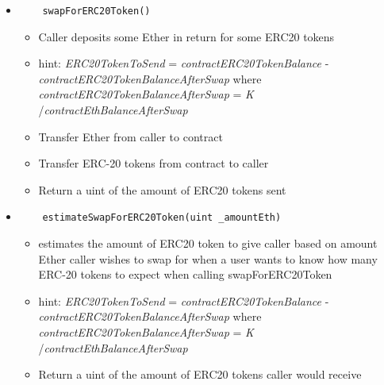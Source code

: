 \documentclass[10pt]{article}
\begin{document}
\begin{itemize}
\item
\begin{verbatim}
    swapForERC20Token() 
\end{verbatim}
\begin{itemize}
    \item Caller deposits some Ether in return for some ERC20 tokens
    \item hint: {\it ERC20TokenToSend} = {\it contractERC20TokenBalance}  - {\it contractERC20TokenBalanceAfterSwap} where {\it contractERC20TokenBalanceAfterSwap} = {\it K} /{\it contractEthBalanceAfterSwap}
    \item Transfer Ether from caller to contract
    \item Transfer ERC-20 tokens from contract to caller
    \item Return a uint of the amount of ERC20 tokens sent
\end{itemize}

\item
\begin{verbatim}
    estimateSwapForERC20Token(uint _amountEth)
\end{verbatim}
\begin{itemize}
    \item estimates the amount of ERC20 token to give caller based on amount Ether caller wishes to swap for when a user wants to know how many ERC-20 tokens to expect when calling swapForERC20Token
    \item hint: {\it ERC20TokenToSend} = {\it contractERC20TokenBalance} - {\it contractERC20TokenBalanceAfterSwap} where {\it contractERC20TokenBalanceAfterSwap} = {\it K} /{\it contractEthBalanceAfterSwap}
    \item Return a uint of the amount of ERC20 tokens caller would receive
\end{itemize}

\end{itemize}
\end{document}
